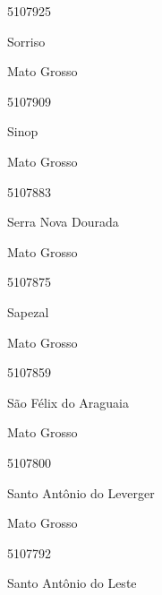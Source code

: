 \documentclass[
  letterpaper,
]{report}
\begin{document}
\n      

5107925

\n      

Sorriso

\n    

\n    

\n      

Mato Grosso

\n      

5107909

\n      

Sinop

\n    

\n    

\n      

Mato Grosso

\n      

5107883

\n      

Serra Nova Dourada

\n    

\n    

\n      

Mato Grosso

\n      

5107875

\n      

Sapezal

\n    

\n    

\n      

Mato Grosso

\n      

5107859

\n      

São Félix do Araguaia

\n    

\n    

\n      

Mato Grosso

\n      

5107800

\n      

Santo Antônio do Leverger

\n    

\n    

\n      

Mato Grosso

\n      

5107792

\n      

Santo Antônio do Leste
\end{document}
